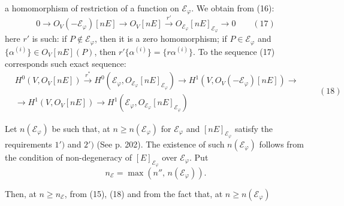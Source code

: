 
a homomorphism of restriction of a function on $\mathcal E_{\varphi}$. We obtain from (16):
\[
0\to O_V(-\mathcal E_{\varphi})[nE]\to O_V[nE]\xrightarrow{r'}O_{\mathcal E_{\varphi}}[nE]_{\mathcal E_{\varphi}}\to 0\qquad(17)
\]
here $r'$ is such: if $P\notin\mathcal E_{\varphi}$, then it is a zero homomorphism; if $P\in\mathcal E_{\varphi}$ and $\{\alpha^{(i)}\}\in O_V[nE](P)$, then $r'\{\alpha^{(i)}\}=\{r\alpha^{(i)}\}$. To the sequence (17) corresponds such exact sequence:
\[
\begin{aligned}
&H^0(V,O_V[nE])\xrightarrow{r^*} H^0(\mathcal E_{\varphi},O_{\mathcal E_{\varphi}}[nE]_{\mathcal E_{\varphi}})\to H^1(V,O_V(-\mathcal E_{\varphi})[nE])\to\\
&\to H^1(V,O_V[nE])\to H^1(\mathcal E_{\varphi},O_{\mathcal E_{\varphi}}[nE]_{\mathcal E_{\varphi}})
\end{aligned}
\qquad(18)
\]

Let $n(\mathcal E_{\varphi})$ be such that, at $n\geq n(\mathcal E_{\varphi})$ for $\mathcal E_{\varphi}$ and $[nE]_{\mathcal E_{\varphi}}$ satisfy the requirements $1')$ and $2')$ (See p. 202). The existence of such $n(\mathcal E_{\varphi})$ follows from the condition of non-degeneracy of $[E]_{\mathcal E_{\varphi}}$ over $\mathcal E_{\varphi}$. Put
\[
n_{\mathcal E}=\max(n'',\,n(\mathcal E_{\varphi})).
\]

Then, at $n\geq n_{\mathcal E}$, from (15), (18) and from the fact that, at $n\geq n(\mathcal E_{\varphi})$

